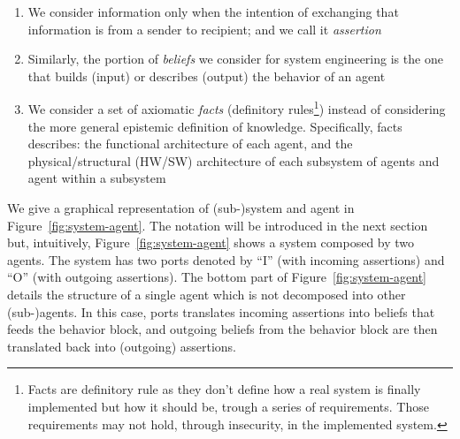 \documentclass[conference]{IEEEtran}
\begin{document}
\begin{enumerate}
	\item We consider information only when the intention of exchanging 
		that information is from a sender to 
		recipient; and we call it \emph{assertion}  
	\item Similarly, the portion of \emph{beliefs} we consider for system
		engineering is the one that builds (input) or describes
		(output) the behavior of an agent 
	\item We consider a set of axiomatic \emph{facts} 
		(definitory
		rules\footnote{Facts are definitory rule as they don't
		define how a real system is finally implemented but
		how it should be, trough a series of requirements. Those requirements 
		may not hold, through insecurity, in the implemented system.}\autocite{Hintikka1993Information})
		instead of considering the more general epistemic definition of
		knowledge. Specifically, facts describes: the functional
		architecture of each agent, and the physical/structural (HW/SW)
		architecture of each subsystem of agents and agent within a
		subsystem
\end{enumerate}
We give a graphical representation of (sub-)system and agent in Figure~\ref{fig:system-agent}.
The notation will be introduced in the next section but, intuitively,
Figure~\ref{fig:system-agent} shows a system composed by two agents. The system
has two ports denoted by ``I'' (with incoming assertions) and ``O'' (with outgoing assertions).
The bottom part of Figure~\ref{fig:system-agent} details the structure of a single
agent which is not decomposed into other (sub-)agents. In this case, ports translates
incoming assertions into beliefs that feeds the behavior block, and outgoing beliefs
from the behavior block are then translated back into (outgoing) assertions.
\end{document}
